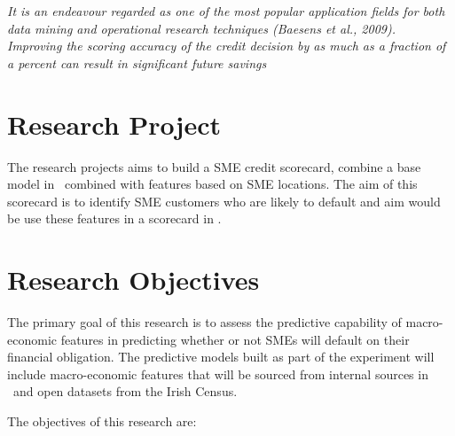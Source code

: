\textit{It is an endeavour regarded as one of the most popular
application fields for both data mining and operational research techniques (Baesens
et al., 2009). Improving the scoring accuracy of the credit decision by as much as
a fraction of a percent can result in significant future savings}

\section{Research Project}
The research projects aims to build a SME credit scorecard, combine a base model in \subjectname\ combined with features based on SME locations. The aim of this scorecard is to identify SME customers who are likely to default and aim would be use these features in a scorecard in \subjectname.



\section{Research Objectives}
The primary goal of this research is to assess the predictive capability of macro-economic features in predicting whether or not SMEs will default on their financial obligation. The predictive models built as part of the experiment will include macro-economic features that will be sourced from internal sources in \subjectname\ and open datasets from the Irish Census.

 
The objectives of this research are:

